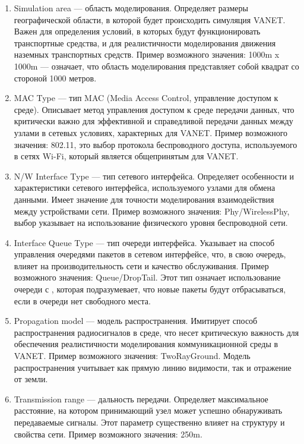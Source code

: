 \begin{enumerate}
  \item Simulation area --- область моделирования. Определяет размеры географической области, в которой будет происходить симуляция VANET. Важен для определения условий, в которых будут функционировать транспортные средства, и для реалистичности моделирования движения наземных транспортных средств. Пример возможного значения: 1000m x 1000m --- означает, что область моделирования представляет собой квадрат со стороной 1000 метров.
  \item MAC Type --- тип MAC (Media Access Control, управление доступом к среде). Описывает метод управления доступом к среде передачи данных, что критически важно для эффективной и справедливой передачи данных между узлами в сетевых условиях, характерных для VANET. Пример возможного значения: 802.11, это выбор протокола беспроводного доступа, используемого в сетях Wi-Fi, который является общепринятым для VANET.
  \item N/W Interface Type --- тип сетевого интерфейса. Определяет особенности и характеристики сетевого интерфейса, используемого узлами для обмена данными. Имеет значение для точности моделирования взаимодействия между устройствами сети. Пример возможного значения: Phy/WirelessPhy, выбор указывает на использование физического уровня беспроводной сети.
  \item Interface Queue Type --- тип очереди интерфейса. Указывает на способ управления очередями пакетов в сетевом интерфейсе, что, в свою очередь, влияет на производительность сети и качество обслуживания. Пример возможного значения: Queue/DropTail. Этот тип означает использование очереди с , которая подразумевает, что новые пакеты будут отбрасываться, если в очереди нет свободного места.
  \item Propagation model --- модель распространения. Имитирует способ распространения радиосигналов в среде, что несет критическую важность для обеспечения реалистичности моделирования коммуникационной среды в VANET. Пример возможного значения: TwoRayGround. Модель распространения  учитывает как прямую линию видимости, так и отражение от земли.
  \item Transmission range --- дальность передачи. Определяет максимальное расстояние, на котором принимающий узел может успешно обнаруживать передаваемые сигналы. Этот параметр существенно влияет на структуру и свойства сети. Пример возможного значения: 250m.

\end{enumerate}
